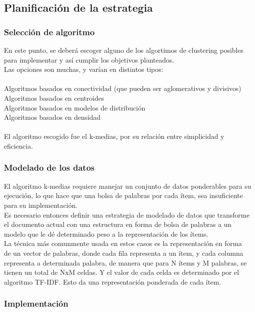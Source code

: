 \subsection{Planificación de la estrategia}

\subsubsection{Selección de algoritmo}
En este punto, se deberá escoger alguno de los algortimos de clustering posibles para implementar y así cumplir los objetivos planteados. \\
Las opciones son muchas, y varían en distintos tipos:\\\\
Algoritmos basados en conectividad (que pueden ser aglomerativos y divisivos)\\
Algoritmos basados en centroides\\
Algoritmos basados en modelos de distribución\\
Algoritmos basados en densidad\\
\\
El algoritmo escogido fue el k-medias, por su relación entre simplicidad y eficiencia. 

\subsubsection{Modelado de los datos}

El algoritmo k-medias requiere manejar un conjunto de datos ponderables para su ejecución, lo que hace que una bolsa de palabras por cada ítem, 
sea insuficiente para su implementación.\\
Es necesario entonces definir una estrategia de modelado de datos que transforme el documento actual con una estructura en forma de bolsa de palabras 
a un modelo que le dé determinado peso a la representación de los ítems.\\
La técnica más comunmente usada en estos casos es la representación en forma de un vector de palabras, donde cada fila representa a un ítem, y 
cada columna representa a determinada palabra, de manera que para N ítems y M palabras, se tienen un total de NxM celdas. Y el valor de cada celda es 
determinado por el algoritmo TF-IDF.
Esto da una representación ponderada de cada ítem.

\subsubsection{Implementación}

